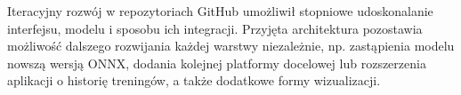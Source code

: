 Iteracyjny rozwój w repozytoriach GitHub umożliwił stopniowe udoskonalanie interfejsu, modelu i sposobu ich integracji. Przyjęta architektura pozostawia możliwość dalszego rozwijania każdej warstwy niezależnie, np. zastąpienia modelu nowszą wersją ONNX, dodania kolejnej platformy docelowej lub rozszerzenia aplikacji o historię treningów, a także dodatkowe formy wizualizacji.